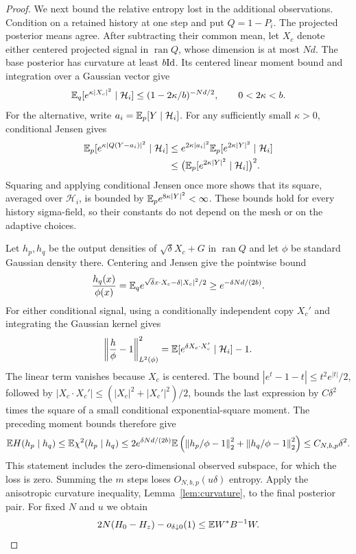 \begin{proof}
We next bound the relative entropy lost in the additional observations.
Condition on a retained history at one step and put $Q=1-P_i$.
The projected posterior means agree.  After subtracting their common
mean, let $X_c$ denote either centered projected signal in
$\operatorname{ran}Q$, whose dimension is at most $Nd$.  The base
posterior has curvature at least $b\mathrm{Id}$.  Its centered linear moment
bound and integration over a Gaussian vector give
\[
 \mathbb E_q[e^{\kappa|X_c|^2}\mid\mathcal H_i]
 \le (1-2\kappa/b)^{-Nd/2},\qquad 0<2\kappa<b.
\]
For the alternative, write $a_i=\mathbb E_p[Y\mid\mathcal H_i]$.  For any
sufficiently small $\kappa>0$, conditional Jensen gives
\begin{align*}
 \mathbb E_p[e^{\kappa|Q(Y-a_i)|^2}\mid\mathcal H_i]
 &\le e^{2\kappa|a_i|^2}
       \mathbb E_p[e^{2\kappa|Y|^2}\mid\mathcal H_i]\\
 &\le\bigl(\mathbb E_p[e^{2\kappa|Y|^2}\mid\mathcal H_i]\bigr)^2.
\end{align*}
Squaring and applying conditional Jensen once more shows that its
square, averaged over $\mathcal H_i$, is bounded by
$\mathbb E_p e^{8\kappa|Y|^2}<\infty$.  These bounds hold for every history
sigma-field, so their constants do not depend on the mesh or on the
adaptive choices.

Let $h_p,h_q$ be the output densities of
$\sqrt\delta X_c+G$ in $\operatorname{ran}Q$ and let $\phi$ be standard
Gaussian density there.  Centering and Jensen give the pointwise bound
\[
 \frac{h_q(x)}{\phi(x)}
 =\mathbb E_q e^{\sqrt\delta x\cdot X_c-\delta|X_c|^2/2}
 \ge e^{-\delta Nd/(2b)}.
\]
For either conditional signal, using a conditionally independent copy
$X_c'$ and integrating the Gaussian kernel gives
\[
 \left\|\frac h\phi-1\right\|_{L^2(\phi)}^2
 =\mathbb E[e^{\delta X_c\cdot X_c'}\mid\mathcal H_i]-1.
\]
The linear term vanishes because $X_c$ is centered.  The bound
$|e^t-1-t|\le t^2e^{|t|}/2$, followed by
$|X_c\cdot X_c'|\le(|X_c|^2+|X_c'|^2)/2$, bounds the last expression
by $C\delta^2$ times the square of a small conditional
exponential-square moment.  The preceding moment bounds therefore give
\[
 \mathbb E H(h_p\mid h_q)
 \le\mathbb E\chi^2(h_p\mid h_q)
 \le2e^{\delta Nd/(2b)}\mathbb E\left(
 \left\|h_p/\phi-1\right\|_2^2+
 \left\|h_q/\phi-1\right\|_2^2\right)
 \le C_{N,b,p}\delta^2.
\]
This statement includes the zero-dimensional observed subspace, for
which the loss is zero.  Summing the $m$ steps loses
$O_{N,b,p}(u\delta)$ entropy.  Apply the anisotropic curvature
inequality, Lemma~\ref{lem:curvature}, to the final posterior pair.
For fixed $N$ and $u$ we obtain
\begin{equation}
 2N(H_0-H_z)-o_{\delta\downarrow0}(1)
 \le\mathbb E W^*B^{-1}W.
 \label{eq:entropy-loss-posterior-lsi}
\end{equation}


\end{proof}
